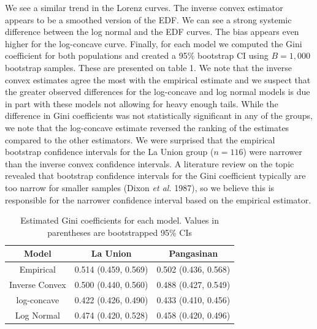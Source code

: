 \documentclass[11pt]{article}
\numberwithin{equation}{section}
\begin{document}
	We see a similar trend in the Lorenz curves. The inverse convex estimator appears to be a smoothed version of the EDF. We can see a strong systemic difference between the log normal and the EDF curves. The bias appears even higher for the log-concave curve. 		
	Finally, for each model we computed the Gini coefficient for both populations and created a 95\% bootstrap CI using $B = 1,000$ bootstrap samples. These are presented on table 1. We note that the inverse convex estimates agree the most with the empirical estimate and we suspect that the greater observed differences for the log-concave and log normal models is due in part with these models not allowing for heavy enough tails. While the difference in Gini coefficients was not statistically significant in any of the groups, we note that the log-concave estimate reversed the ranking of the estimates compared to the other estimators. We were surprised that the empirical bootstrap confidence intervals for the La Union group ($n = 116$) were narrower than the inverse convex confidence intervals. A literature review on the topic revealed that bootstrap confidence intervals for the Gini coefficient typically are too narrow for smaller samples (Dixon \emph{et al.} 1987), so we believe this is responsible for the narrower confidence interval based on the empirical estimator. 
	
	\begin{table}

\begin{center}	
\caption[Estimated Gini Coefficients from Different Model Fits]{Estimated Gini coefficients for each model. Values in parentheses are bootstrapped 95\% CIs}

\begin{tabular} {| c | c | c |} 

	
	\hline
	Model			&	La Union			&	Pangasinan 	\\
	\hline
	
	Empirical			&	0.514 (0.459, 0.569)			&	0.502 (0.436, 0.568)		\\
	\hline
	
	Inverse Convex	&	 0.500 (0.440, 0.560)		&	0.488 (0.427, 0.549)		\\
	\hline
	
	log-concave		&	0.422 (0.426, 0.490)			&	0.433 (0.410, 0.456)		\\
	\hline
	
	Log Normal		&	0.474  (0.420, 0.528)		&	0.458 (0.420, 0.496)		\\
	
	 \hline
	 
\end{tabular}

\end{center}	 

\end{table}
\end{document}
